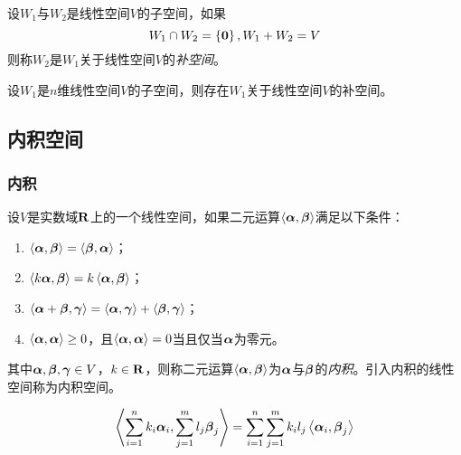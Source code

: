 \documentclass{ctexart}
\begin{document}
\begin{definition}[补空间]
    设\(W_1\)与\(W_2\)是线性空间\(V\)的子空间，如果
    \begin{equation*}
        W_1\cap W_2=\setof{\veczero},W_1+W_2=V
    \end{equation*}
    则称\(W_2\)是\(W_1\)关于线性空间\(V\)的\emph{补空间}。
\end{definition}

\begin{theorem}[补空间存在性定理]
    设\(W_1\)是\(n\)维线性空间\(V\)的子空间，则存在\(W_1\)关于线性空间\(V\)的补空间。
\end{theorem}

\subsection{内积空间}

\subsubsection*{内积}

\begin{definition}[内积]
    设\(V\)是实数域\(\rea\)上的一个线性空间，如果二元运算\(\indot{\vecal}{\vecbeta}\)满足以下条件：
    \begin{enumerate}
        \item \(\indot{\vecal}{\vecbeta}=\indot{\vecbeta}{\vecal}\)；
        \item \(\indot{k\vecal}{\vecbeta}=k\indot{\vecal}{\vecbeta}\)；
        \item \(\indot{\vecal+\vecbeta}{\vecgamma}=\indot{\vecal}{\vecgamma}+\indot{\vecbeta}{\vecgamma}\)；
        \item \(\indot{\vecal}{\vecal}\ge0\)，且\(\indot{\vecal}{\vecal}=0\)当且仅当\(\vecal\)为零元。
    \end{enumerate}
    其中\(\vecal,\vecbeta,\vecgamma\in V\)，\(k\in\rea\)，则称二元运算\(\indot{\vecal}{\vecbeta}\)为\(\vecal\)与\(\vecbeta\)的\emph{内积}。引入内积的线性空间称为内积空间。
\end{definition}

\begin{property}
    \begin{equation*}
        \indot{\sum_{i=1}^nk_i\vecal_i}{\sum_{j=1}^ml_j\vecbeta_j}=\sum_{i=1}^n\sum_{j=1}^mk_il_j\indot{\vecal_i}{\vecbeta_j}
    \end{equation*}
\end{property}
\end{document}
